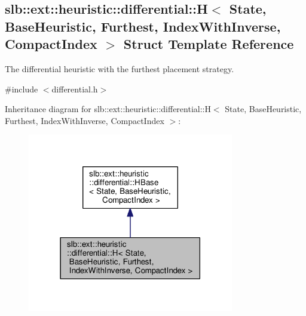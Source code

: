 \hypertarget{structslb_1_1ext_1_1heuristic_1_1differential_1_1H_3_01State_00_01BaseHeuristic_00_01Furthest_0071671274a92eae86902a47a514057667}{}\subsection{slb\+:\+:ext\+:\+:heuristic\+:\+:differential\+:\+:H$<$ State, Base\+Heuristic, Furthest, Index\+With\+Inverse, Compact\+Index $>$ Struct Template Reference}
\label{structslb_1_1ext_1_1heuristic_1_1differential_1_1H_3_01State_00_01BaseHeuristic_00_01Furthest_0071671274a92eae86902a47a514057667}


The differential heuristic with the furthest placement strategy.  




{\ttfamily \#include $<$differential.\+h$>$}



Inheritance diagram for slb\+:\+:ext\+:\+:heuristic\+:\+:differential\+:\+:H$<$ State, Base\+Heuristic, Furthest, Index\+With\+Inverse, Compact\+Index $>$\+:\nopagebreak
\begin{figure}[H]
\begin{center}
\leavevmode
\includegraphics[width=255pt]{structslb_1_1ext_1_1heuristic_1_1differential_1_1H_3_01State_00_01BaseHeuristic_00_01Furthest_00c620e7ab6ca309a15f26cb410bb0cd3f}
\end{center}
\end{figure}


